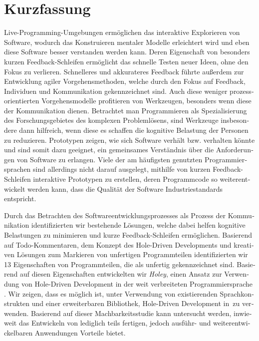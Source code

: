 \chapter{Kurzfassung}

\begin{german} %
    Live-Programming-Umgebungen ermöglichen das interaktive Explorieren von Software, wodurch das Konstruieren mentaler Modelle erleichtert wird und eben diese Software besser verstanden werden kann.
    Deren Eigenschaft von besonders kurzen Feedback-Schleifen ermöglicht das schnelle Testen neuer Ideen, ohne den Fokus zu verlieren.
    Schnelleres und akkurateres Feedback führte außerdem zur Entwicklung agiler Vorgehensmethoden, welche durch den Fokus auf Feedback, Individuen und Kommunikation gekennzeichnet sind.
    Auch diese weniger prozessorientierten Vorgehensmodelle profitieren von Werkzeugen, besonders wenn diese der Kommunikation dienen.
    Betrachtet man Programmieren als Spezialisierung des Forschungsgebietes des komplexen Problemlösens, sind Werkzeuge insbesondere dann hilfreich, wenn diese es schaffen die kognitive Belastung der Personen zu reduzieren.
    Prototypen zeigen, wie sich Software verhält bzw. verhalten könnte und sind somit dazu geeignet, ein gemeinsames Verständnis über die Anforderungen von Software zu erlangen.
    Viele der am häufigsten genutzten Programmiersprachen sind allerdings nicht darauf ausgelegt, mithilfe von kurzen Feedback-Schleifen interaktive Prototypen zu erstellen, deren Programmcode so weiterentwickelt werden kann, dass die Qualität der Software Industriestandards entspricht.

    Durch das Betrachten des Softwareentwicklungsprozesses als Prozess der Kommunikation identifizierten wir bestehende Lösungen, welche dabei helfen kognitive Belastungen zu minimieren und kurze Feedback-Schleifen ermöglichen.
    Basierend auf Todo-Kommentaren, dem Konzept des Hole-Driven Developments und kreativen Lösungen zum Markieren von unfertigen Programmteilen identifizierten wir 13 Eigenschaften von Programmteilen, die als unfertig gekennzeichnet sind.
    Basierend auf diesen Eigenschaften entwickelten wir \emph{Holey}, einen Ansatz zur Verwendung von Hole-Driven Development in der weit verbreiteten Programmiersprache \CS.
    Wir zeigen, dass es möglich ist, unter Verwendung von existierenden Sprachkonstrukten und einer erweiterbaren Bibliothek, Hole-Driven Development in\ \CS zu verwenden.
    Basierend auf dieser Machbarkeitsstudie kann untersucht werden, inwieweit das Entwickeln von lediglich teils fertigen, jedoch ausführ- und weiterentwickelbaren Anwendungen Vorteile bietet.
\end{german}